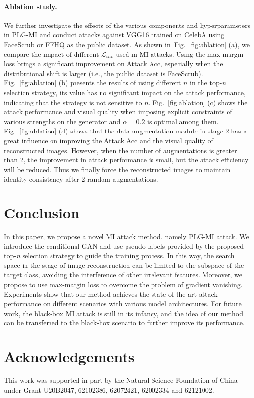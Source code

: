 \documentclass[letterpaper]{article} %
\newcommand{\Fref}[1]{Fig.~\ref{#1}}
\begin{document}
\paragraph{Ablation study.}
We further investigate the effects of the various components and hyperparameters in PLG-MI and conduct attacks against VGG16 trained on CelebA using FaceScrub or FFHQ as the public dataset. As shown in~\Fref{fig:ablation} (a), we compare the impact of different $\mathcal{L}_{inv}$ used in MI attacks. Using the max-margin loss brings a significant improvement on Attack Acc, especially when the distributional shift is larger (i.e., the public dataset is FaceScrub). \Fref{fig:ablation} (b) presents the results of using different $n$ in the top-\emph{n} selection strategy, its value has no significant impact on the attack performance, indicating that the strategy is not sensitive to $n$. \Fref{fig:ablation} (c) shows the attack performance and visual quality when imposing explicit constraints of various strengths on the generator and $\alpha=0.2$ is optimal among them. \Fref{fig:ablation} (d) shows that the data augmentation module in stage-2 has a great influence on improving the Attack Acc and the visual quality of reconstructed images. However, when the number of augmentations is greater than 2, the improvement in attack performance is small, but the attack efficiency will be reduced. Thus we finally force the reconstructed images to maintain identity consistency after 2 random augmentations.

\section{Conclusion} 
In this paper, we propose a novel MI attack method, namely PLG-MI attack. We introduce the conditional GAN and use pseudo-labels provided by the proposed top-\emph{n} selection strategy to guide the training process. In this way, the search space in the stage of image reconstruction can be limited to the subspace of the target class, avoiding the interference of other irrelevant features. Moreover, we propose to use max-margin loss to overcome the problem of gradient vanishing. Experiments show that our method achieves the state-of-the-art attack performance on different scenarios with various model architectures. For future work, the black-box MI attack is still in its infancy, and the idea of our method can be transferred to the black-box scenario to further improve its performance.

\section*{Acknowledgements}
This work was supported in part by the Natural Science Foundation of China
under Grant  U20B2047, 62102386, 62072421, 62002334 and 62121002.
\end{document}
